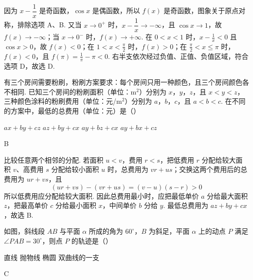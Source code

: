 \begin{solution}
因为 \(x-\dfrac{1}{x}\) 是奇函数，\(\cos x\) 是偶函数，所以 \(f(x)\) 是奇函数，图象关于原点对称，排除选项 A、B. 又当 \(x\to0^+\) 时，\(x-\dfrac{1}{x}\to-\infty\)，且 \(\cos x\to1\)，故 \(f(x)\to-\infty\)；当 \(x\to0^-\) 时，\(f(x)\to+\infty\). 在 \(0<x<1\) 时，\(x-\frac{1}{x}<0\) 且 \(\cos x>0\)，故 \(f(x)<0\)；在 \(1<x<\frac{\pi}{2}\) 时，\(f(x)>0\)；在 \(\frac{\pi}{2}<x\leqslant\pi\) 时，\(f(x)<0\)，且 \(f(\pi)=\frac{1}{\pi}-\pi<0\). 右半支依次经过负值、正值、负值区域，符合选项 D，故选 D.
\end{solution}

\begin{problem}
有三个房间需要粉刷，粉刷方案要求：每个房间只用一种颜色，且三个房间颜色各不相同. 已知三个房间的粉刷面积（单位：\(\mathrm{m}^2\)）分别为 \(x\)，\(y\)，\(z\)，且 \(x<y<z\)，三种颜色涂料的粉刷费用（单位：元/\(\mathrm{m}^2\)）分别为 \(a\)，\(b\)，\(c\)，且 \(a<b<c\). 在不同的方案中，最低的总费用（单位：元）是（\quad）

\choices
    {\(ax+by+cz\)}
    {\(az+by+cx\)}
    {\(ay+bz+cx\)}
    {\(ay+bx+cz\)}
\end{problem}

\begin{answer}
B
\end{answer}

\begin{solution}
比较任意两个相邻的分配. 若面积 \(u<v\)，费用 \(r<s\)，把低费用 \(r\) 分配给较大面积 \(v\)、高费用 \(s\) 分配给较小面积 \(u\) 时，总费用为 \(vr+us\)；交换这两个费用后的总费用为 \(ur+vs\)，且
\[
(ur+vs)-(vr+us)=(v-u)(s-r)>0
\]
所以低费用应分配给较大面积. 因此总费用最小时，应把最低单价 \(a\) 分给最大面积 \(z\)，把最高单价 \(c\) 分给最小面积 \(x\)，中间单价 \(b\) 分给 \(y\). 最低总费用为 \(az+by+cx\)，故选 B.
\end{solution}

\begin{problem}
如图，斜线段 \(AB\) 与平面 \(\alpha\) 所成的角为 \(60^\circ\)，\(B\) 为斜足，平面 \(\alpha\) 上的动点 \(P\) 满足 \(\angle PAB=30^\circ\)，则点 \(P\) 的轨迹是（\quad）


\choices
    {直线}
    {抛物线}
    {椭圆}
    {双曲线的一支}
\end{problem}

\begin{answer}
C
\end{answer}

